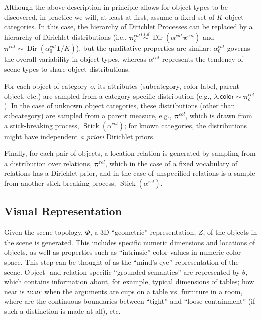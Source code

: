 \documentclass[12pt]{article}
\DeclareMathOperator{\Stick}{Stick}
\DeclareMathOperator{\Dir}{Dir}
\begin{document}
Although the above description in principle allows for object types to be discovered, in practice we will, at least at first, assume a fixed set of $K$ object categories.  In this case, the hierarchy of Dirichlet Processes can be replaced by a hierarchy of Dirichlet distributions (i.e., $\boldsymbol{\pi}^{cat}_c \stackrel{i.i.d.}{\sim} \Dir(\alpha^{cat} \boldsymbol{\pi}^{cat})$ and $\boldsymbol{\pi}^{cat} \sim \Dir(\alpha_0^{cat} \boldsymbol{1} / K)$), but the qualitative properties are similar: $\alpha_0^{cat}$ governs the overall variability in object types, whereas $\alpha^{cat}$ represents the tendency of scene types to share object distributions.

For each object of category $o$, its attributes (subcategory, color label, parent object, etc.) are sampled from a category-specific distribution (e.g., $\lambda.\textsf{color} \sim \boldsymbol{\pi}^{col}_o$).  In the case of unknown object categories, these distributions (other than subcategory) are sampled from a parent measure, e.g., $\boldsymbol{\pi}^{col}$, which is drawn from a stick-breaking process, $\Stick(\alpha^{col})$; for known categories, the distributions might have independent {\it a priori} Dirichlet priors.

Finally, for each pair of objects, a location relation is generated by sampling from a distribution over relations, $\boldsymbol{\pi}^{rel}$, which in the case of a fixed vocabulary of relations has a Dirichlet prior, and in the case of unspecified relations is a sample from another stick-breaking process, $\Stick(\alpha^{rel})$.

\subsection{Visual Representation}
\label{sec:vis-repr}
Given the scene topology, $\Phi$, a 3D ``geometric'' representation, $Z$, of the objects in the scene is generated.  This includes specific numeric dimensions and locations of objects, as well as properties such as ``intrinsic'' color values in numeric color space.  This step can be thought of as the ``mind's eye'' representation of the scene.  Object- and relation-specific ``grounded semantics'' are represented by $\theta$, which contains information about, for example, typical dimensions of tables; how near is ${\sc near}$ when the arguments are cups on a table vs. furniture in a room, where are the continuous boundaries between ``tight'' and ``loose containment'' (if such a distinction is made at all), etc.
\end{document}
